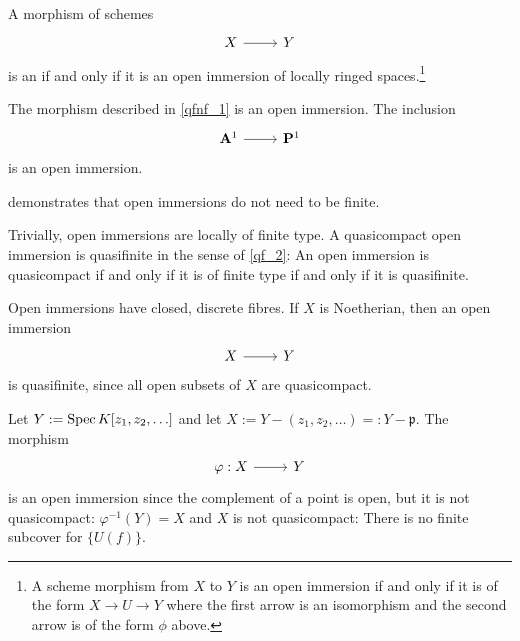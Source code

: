 \documentclass [11 pt, oneside] {article}
\begin{document}
A morphism of schemes
\[
\begin{tikzcd}
X\ar[r]& Y
\end{tikzcd}
\]  
is an  if and only if it is an open immersion of locally ringed spaces.\footnote{A scheme morphism from $X$ to $Y$ is an open immersion if and only if it is of the form $X\longrightarrow U\longrightarrow Y$
where the first arrow is an isomorphism and the second arrow is of the form $\phi$ above.}

\begin{example}[ ]\label{op_im_ex}\text{}
The morphism described in \cref{qfnf_1} is an open immersion. The inclusion
\[
\begin{tikzcd}
\mathbf{A}^1 \ar[r]& \mathbf{P}^1
\end{tikzcd}
\]  
is an open immersion.
\end{example}

\begin{remark}
	 demonstrates that open immersions do not need to be finite. 
\end{remark}

\begin{remark}
	Trivially, open immersions are locally of finite type. A quasicompact open immersion is quasifinite in the sense of \cref{qf_2}: An open immersion is quasicompact if and only if it is of finite type if and only if it is quasifinite.
\end{remark}

\begin{remark}
	Open immersions have closed, discrete fibres. If $X$ is Noetherian, then an open immersion 
	\[
\begin{tikzcd}
X\ar[r]& Y
\end{tikzcd}
\]
 is quasifinite, since all open subsets of $X$ are quasicompact.
\end{remark}

\begin{example}[ ]\label{remember}\text{}
Let $Y:= \operatorname{Spec} K[z_1,z_2,\hdots]$ and let $X := Y - (z_1,z_2,\hdots) =: Y-\mathfrak{p}$. The morphism 
\[
\begin{tikzcd}
\varphi :X\ar[r]& Y
\end{tikzcd}
\]
is an open immersion since the complement of a point is open, but it is not quasicompact: $\varphi^{-1}(Y)=X$ and $X$ is not quasicompact: There is no finite subcover for $\{U(f)\}$.
\end{example}
\end{document}
